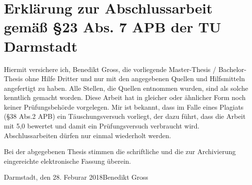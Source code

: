 \chapter*{Erkl\"arung zur Abschlussarbeit gem\"aß \S 23 Abs. 7 APB der TU Darmstadt}

Hiermit versichere ich, Benedikt Gross, die vorliegende Master-Thesis / Bachelor-Thesis ohne Hilfe Dritter und nur mit den angegebenen Quellen und Hilfsmitteln angefertigt zu haben. Alle Stellen, die Quellen entnommen wurden, sind als solche kenntlich gemacht worden. Diese Arbeit hat in gleicher oder \"ahnlicher Form noch keiner Pr\"ufungsbeh\"orde vorgelegen.  
Mir ist bekannt, dass im Falle eines Plagiats (\S 38 Abs.2 APB) ein T\"auschungsversuch vorliegt, der dazu f\"uhrt, dass die Arbeit mit 5,0 bewertet und damit ein Pr\"ufungsversuch verbraucht wird. Abschlussarbeiten d\"urfen nur einmal wiederholt werden.
	
Bei der abgegebenen Thesis stimmen die schriftliche und die zur Archivierung eingereichte elektronische Fassung \"uberein. 
	
\vspace{1.5cm}
	
\noindent Darmstadt, den 28. Feburar 2018\hfill Benedikt Gross